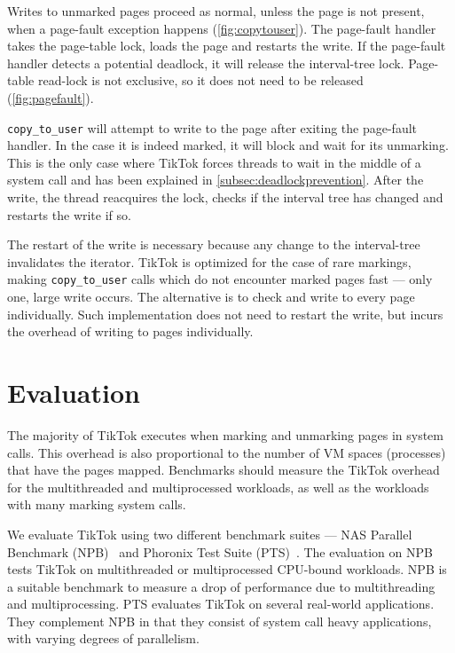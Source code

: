\documentclass[conference]{IEEEtran}
\newcommand{\sysname}{TikTok}
\begin{document}
Writes to unmarked pages proceed as normal, unless the page is not present, when
a page-fault exception happens (\autoref{fig:copytouser}). The page-fault
handler takes the page-table lock, loads the page and restarts the write. If the
page-fault handler detects a potential deadlock, it will release the
interval-tree lock. Page-table read-lock is not exclusive, so it does not need
to be released (\autoref{fig:pagefault}).

\texttt{copy\_to\_user} will attempt to write to the page after exiting the
page-fault handler. In the case it is indeed marked, it will block and wait for
its unmarking. This is the only case where \sysname{} forces threads to wait in
the middle of a system call and has been explained in
\autoref{subsec:deadlockprevention}. After the write, the thread reacquires the
lock, checks if the interval tree has changed and restarts the write if so.

The restart of the write is necessary because any change to the interval-tree
invalidates the iterator. \sysname{} is optimized for the case of rare markings,
making \texttt{copy\_to\_user} calls which do not encounter marked pages fast
--- only one, large write occurs. The alternative is to check and write to every
page individually. Such implementation does not need to restart the write, but
incurs the overhead of writing to pages individually.

\section{Evaluation}
\label{sec:evaluation}


The majority of \sysname{} executes when marking and unmarking pages in system
calls. This overhead is also proportional to the number of VM spaces (processes)
that have the pages mapped. Benchmarks should measure the \sysname{} overhead
for the multithreaded and multiprocessed workloads, as well as the workloads
with many marking system calls.

We evaluate \sysname{} using two different benchmark suites --- NAS Parallel
Benchmark (NPB)~\cite{npb} and Phoronix Test Suite (PTS)~\cite{pts}. The
evaluation on NPB tests \sysname{} on multithreaded or multiprocessed CPU-bound
workloads. NPB is a suitable benchmark to measure a drop of performance due to
multithreading and multiprocessing. PTS evaluates \sysname{} on several
real-world applications. They complement NPB in that they consist of system call
heavy applications, with varying degrees of parallelism.
\end{document}
